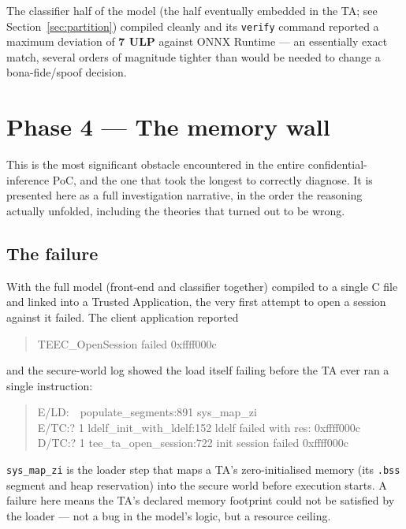 \documentclass[11pt,a4paper]{report}
\newcommand{\code}[1]{\texttt{\small #1}}
\begin{document}
The classifier half of the model (the half eventually embedded in the TA; see
Section~\ref{sec:partition}) compiled cleanly and its \code{verify} command reported a maximum
deviation of \textbf{7 ULP} against ONNX Runtime --- an essentially exact match, several orders of
magnitude tighter than would be needed to change a bona-fide/spoof decision.

\section{Phase 4 --- The memory wall}
\label{sec:memory-wall}

This is the most significant obstacle encountered in the entire confidential-inference PoC, and the
one that took the longest to correctly diagnose. It is presented here as a full investigation
narrative, in the order the reasoning actually unfolded, including the theories that turned out to
be wrong.

\subsection{The failure}

With the full model (front-end and classifier together) compiled to a single C file and linked into
a Trusted Application, the very first attempt to open a session against it failed. The client
application reported

\begin{quote}\small\ttfamily
TEEC\_OpenSession failed 0xffff000c
\end{quote}

and the secure-world log showed the load itself failing before the TA ever ran a single instruction:

\begin{quote}\small\ttfamily
E/LD:\ \ populate\_segments:891 sys\_map\_zi\\
E/TC:? 1 ldelf\_init\_with\_ldelf:152 ldelf failed with res: 0xffff000c\\
D/TC:? 1 tee\_ta\_open\_session:722 init session failed 0xffff000c
\end{quote}

\code{sys\_map\_zi} is the loader step that maps a TA's zero-initialised memory (its \code{.bss}
segment and heap reservation) into the secure world before execution starts. A failure here means
the TA's declared memory footprint could not be satisfied by the loader --- not a bug in the model's
logic, but a resource ceiling.
\end{document}
